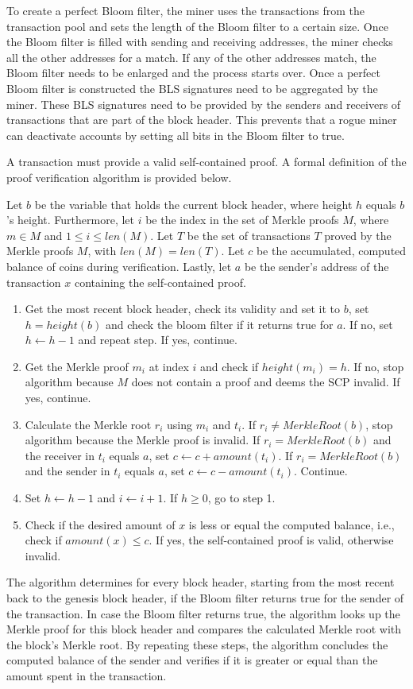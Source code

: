 \documentclass[conference]{IEEEtran}
\begin{document}
To create a perfect Bloom filter, the miner uses the transactions from the transaction pool and sets the length of the Bloom filter to a certain size. Once the Bloom filter is filled with sending and receiving addresses, the miner checks all the other addresses for a match. If any of the other addresses match, the Bloom filter needs to be enlarged and the process starts over. Once a perfect Bloom filter is constructed the BLS signatures need to be aggregated by the miner. These BLS signatures need to be provided by the senders and receivers of transactions that are part of the block header. This prevents that a rogue miner can deactivate accounts by setting all bits in the Bloom filter to true.

A transaction must provide a valid self-contained proof. A formal definition of the proof verification algorithm is provided below.

Let $b$ be the variable that holds the current block header, where height $h$ equals $b$'s height. Furthermore, let $i$ be the index in the set of Merkle proofs $M$, where $m \in M$ and $1 \leq i \leq len(M)$. Let $T$ be the set of transactions $T$ proved by the Merkle proofs $M$, with $len(M) = len(T)$. Let $c$ be the accumulated, computed balance of coins during verification. Lastly, let $a$ be the sender's address of the transaction $x$ containing the self-contained proof.
\begin{enumerate}
 \item Get the most recent block header, check its validity and set it to $b$, set $h = height(b)$ and check the bloom filter if it returns true for $a$. If no, set $h \leftarrow h - 1$ and repeat step. If yes, continue.
 \item Get the Merkle proof $m_i$ at index $i$ and check if $height(m_i) = h$. If no, stop algorithm because $M$ does not contain a proof and deems the SCP invalid. If yes, continue.
 \item Calculate the Merkle root $r_i$ using $m_i$ and $t_i$. If $r_i \neq MerkleRoot(b)$, stop algorithm because the Merkle proof is invalid. If $r_i = MerkleRoot(b)$ and the receiver in $t_i$ equals $a$, set $c \leftarrow c + amount(t_i)$. If $r_i = MerkleRoot(b)$ and the sender in $t_i$ equals $a$, set $c \leftarrow c - amount(t_i)$. Continue.
 \item Set $h \leftarrow h - 1$ and $i \leftarrow i + 1$. If $h \geq 0$, go to step 1.
 \item Check if the desired amount of $x$ is less or equal the computed balance, i.e., check if $amount(x) \leq c$. If yes, the self-contained proof is valid, otherwise invalid.
\end{enumerate}
The algorithm determines for every block header, starting from the most recent back to the genesis block header, if the Bloom filter returns true for the sender of the transaction. In case the Bloom filter returns true, the algorithm looks up the Merkle proof for this block header and compares the calculated Merkle root with the block's Merkle root. By repeating these steps, the algorithm concludes the computed balance of the sender and verifies if it is greater or equal than the amount spent in the transaction.
\end{document}
